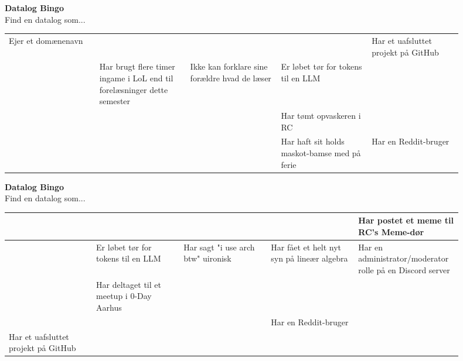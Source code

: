\documentclass{article}
\begin{document}
\begin{center}
{\LARGE\bfseries Datalog Bingo}\\[0.5em]
{\large Find en datalog som...}\\[2em]
\begin{tabular}{|p{0.18\linewidth}|p{0.18\linewidth}|p{0.18\linewidth}|p{0.18\linewidth}|p{0.18\linewidth}|}
\hline
  &   &   &   &   \\
\hline
Ejer et domænenavn &   &   &   & Har et uafsluttet projekt på GitHub \\
\hline
  & Har brugt flere timer ingame i LoL end til forelæsninger dette semester & Ikke kan forklare sine forældre hvad de læser & Er løbet tør for tokens til en LLM &   \\
\hline
  &   &   & Har tømt opvaskeren i RC &   \\
\hline
  &   &   & Har haft sit holds maskot-bamse med på ferie & Har en Reddit-bruger \\
\hline
\end{tabular}
\end{center}
\newpage

\begin{center}
{\LARGE\bfseries Datalog Bingo}\\[0.5em]
{\large Find en datalog som...}\\[2em]
\begin{tabular}{|p{0.18\linewidth}|p{0.18\linewidth}|p{0.18\linewidth}|p{0.18\linewidth}|p{0.18\linewidth}|}
\hline
  &   &   &   & Har postet et meme til RC's Meme-dør \\
\hline
  & Er løbet tør for tokens til en LLM & Har sagt "i use arch btw" uironisk & Har fået et helt nyt syn på lineær algebra & Har en administrator/moderator rolle på en Discord server \\
\hline
  & Har deltaget til et meetup i  0-Day Aarhus &   &   &   \\
\hline
  &   &   & Har en Reddit-bruger &   \\
\hline
Har et uafsluttet projekt på GitHub &   &   &   &   \\
\hline
\end{tabular}
\end{center}
\end{document}
